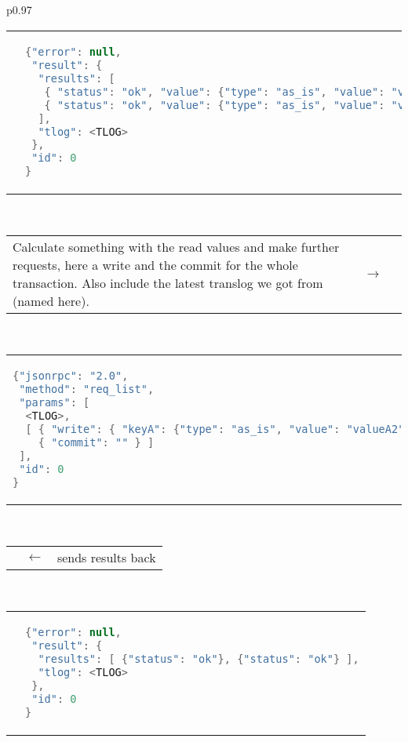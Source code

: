 \begin{longtable}{p{}}
\begin{tabular}{p{}p{}}
& 
\vspace{-1.5em}%
\begin{lstlisting}[language=java]
{"error": null,
 "result": {
  "results": [
   { "status": "ok", "value": {"type": "as_is", "value": "valueA"} },
   { "status": "ok", "value": {"type": "as_is", "value": "valueB"} }
  ],
  "tlog": <TLOG>
 },
 "id": 0
}
\end{lstlisting} \\
\end{tabular} \\
%
\begin{tabular}{p{}cp{}}
Calculate something with the read values and make further requests, here a
write and the commit for the whole transaction. Also include the latest
translog we got from \scalaris{} (named \code{<TLOG>} here). & $\to$ & \\
\end{tabular}\vspace{-1.5em} \\
%
\begin{tabular}{p{}p{}}
\vspace{-1.5em}%
\begin{lstlisting}[language=java]
{"jsonrpc": "2.0",
 "method": "req_list",
 "params": [
  <TLOG>,
  [ { "write": { "keyA": {"type": "as_is", "value": "valueA2"} } },
    { "commit": "" } ]
 ],
 "id": 0
}
\end{lstlisting}
& \\
\end{tabular}\vspace{-1em} \\
%
\begin{tabular}{p{}cp{}}
 & $\leftarrow$ & \hfill{}\scalaris{} sends results back \\
\end{tabular}\vspace{-1.5em} \\

\begin{tabular}{p{}p{}}
& 
\vspace{-1.5em}%
\begin{lstlisting}[language=java]
{"error": null,
 "result": {
  "results": [ {"status": "ok"}, {"status": "ok"} ],
  "tlog": <TLOG>
 },
 "id": 0
}
\end{lstlisting} \\
\end{tabular} \\
\end{longtable}

